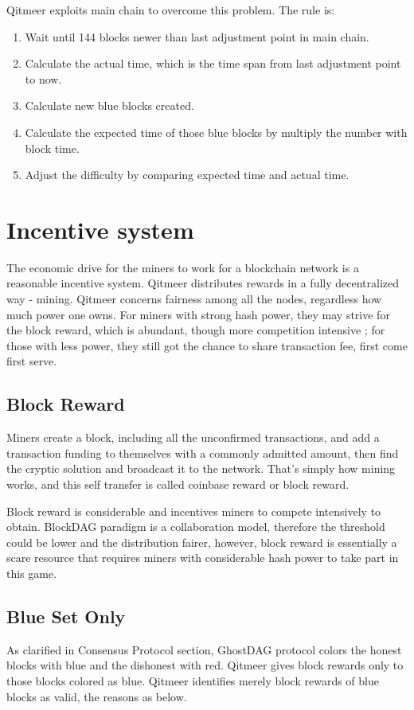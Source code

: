 \documentclass[a4paper,11pt]{article}
\begin{document}
Qitmeer exploits main chain to overcome this problem. The rule is:

\begin{enumerate}
	\item  Wait until 144 blocks newer than last adjustment point in main chain.
    \item  Calculate the actual time, which is the time span from last adjustment point to now.
    \item  Calculate new blue blocks created.
    \item  Calculate the expected time of those blue blocks by multiply the number with block time.
    \item  Adjust the difficulty by comparing expected time and actual time.
\end{enumerate}



\section{Incentive system}
The economic drive for the miners to work for a blockchain network is a reasonable incentive system. Qitmeer distributes rewards in a fully decentralized way - mining. Qitmeer concerns fairness among all the nodes, regardless how much power one owns. For miners with strong hash power, they may strive for the block reward, which is abundant, though more competition intensive ; for those with less power, they still got the chance to share transaction fee, first come first serve.

\subsection{Block Reward}
Miners create a block, including all the unconfirmed transactions, and add a transaction funding to themselves with a commonly admitted amount, then find the cryptic solution and broadcast it to the network. That's simply how mining works, and  this self transfer is called coinbase reward or block reward. 

Block reward is considerable and incentives miners to compete intensively to obtain.  BlockDAG paradigm is a collaboration model, therefore the threshold could be lower and the distribution  fairer, however, block reward is essentially a scare resource that requires miners with considerable hash power to take part in this game.

\subsection*{Blue Set Only}
As clarified in Consensus Protocol section, GhostDAG protocol colors the honest blocks with blue and the dishonest with red. Qitmeer gives block rewards only to those blocks colored as blue.
Qitmeer identifies merely block rewards of blue blocks as valid, the reasons as below.
\end{document}

